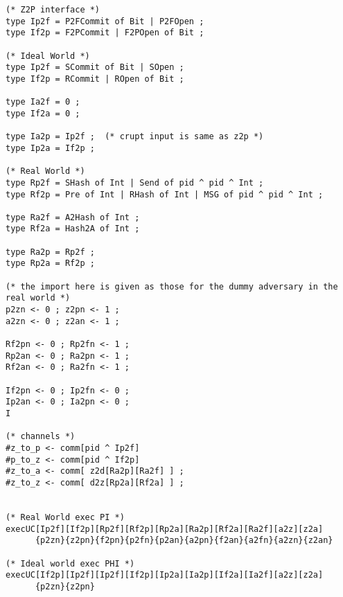 \begin{figure*}
\begin{lstlisting}[basicstyle=\BeraMonottFamily]
(* Z2P interface *)
type Ip2f = P2FCommit of Bit | P2FOpen ;
type If2p = F2PCommit | F2POpen of Bit ;

(* Ideal World *)
type Ip2f = SCommit of Bit | SOpen ;
type If2p = RCommit | ROpen of Bit ;

type Ia2f = 0 ;
type If2a = 0 ;

type Ia2p = Ip2f ;	(* crupt input is same as z2p *)
type Ip2a = If2p ;

(* Real World *)
type Rp2f = SHash of Int | Send of pid ^ pid ^ Int ;
type Rf2p = Pre of Int | RHash of Int | MSG of pid ^ pid ^ Int ;

type Ra2f = A2Hash of Int ;
type Rf2a = Hash2A of Int ;

type Ra2p = Rp2f ;
type Rp2a = Rf2p ;

(* the import here is given as those for the dummy adversary in the real world *)
p2zn <- 0 ; z2pn <- 1 ;
a2zn <- 0 ; z2an <- 1 ; 

Rf2pn <- 0 ; Rp2fn <- 1 ;
Rp2an <- 0 ; Ra2pn <- 1 ;
Rf2an <- 0 ; Ra2fn <- 1 ;

If2pn <- 0 ; Ip2fn <- 0 ;
Ip2an <- 0 ; Ia2pn <- 0 ;
I

(* channels *)
#z_to_p <- comm[pid ^ Ip2f]
#p_to_z <- comm[pid ^ If2p]
#z_to_a <- comm[ z2d[Ra2p][Ra2f] ] ;
#z_to_z <- comm[ d2z[Rp2a][Rf2a] ] ;


(* Real World exec PI *)
execUC[Ip2f][If2p][Rp2f][Rf2p][Rp2a][Ra2p][Rf2a][Ra2f][a2z][z2a]
	  {p2zn}{z2pn}{f2pn}{p2fn}{p2an}{a2pn}{f2an}{a2fn}{a2zn}{z2an}

(* Ideal world exec PHI *)
execUC[If2p][Ip2f][Ip2f][If2p][Ip2a][Ia2p][If2a][Ia2f][a2z][z2a]
	  {p2zn}{z2pn}






\end{lstlisting}
\end{figure*}
